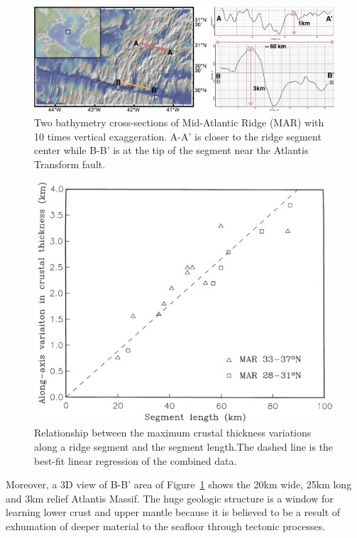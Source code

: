 \documentclass[12pt]{article}
\begin{document}
\begin{figure}[H]
 \centering
  \includegraphics[scale=0.4]{fig2_1.png}
 \caption{\small{Two bathymetry cross-sections of Mid-Atlantic Ridge (MAR) with 10 times vertical exaggeration. A-A' is closer to the ridge segment center while B-B' is at the tip of the segment near the Atlantis Transform fault.}}
 \label{fig2_1}
\end{figure}

\begin{figure}[H]
 \centering
  \includegraphics[scale=0.3]{fig3_1.png}
 \caption{\small{Relationship between the maximum crustal thickness variations along a ridge segment and the segment length.The dashed line is the best-fit linear regression of the combined data. \citep{Chen1999}}}
 \label{fig3_1}
\end{figure}

Moreover, a 3D view of B-B' area of Figure~\ref{fig2_1} shows the 20km wide, 25km long and 3km relief Atlantis Massif. The huge geologic structure is a window for learning lower crust and upper mantle because it is believed to be a result of exhumation of deeper material to the seafloor through tectonic processes.
\end{document}
